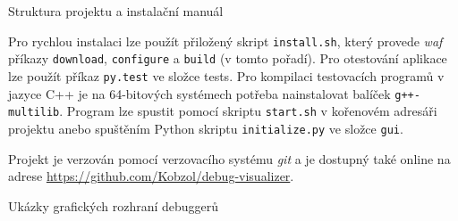 \documentclass[bc,male,python,dept460]{diploma}						%
\newcommand{\parspace}[1][]{
	\ifthenelse{\isempty{#1}}{\vspace{5mm}}{\vspace{#1}}
	\par
}
\begin{document}
\begin{section}{Struktura projektu a instalační manuál}
	\parspace Pro rychlou instalaci lze použít přiložený skript \texttt{install.sh}, který provede \textit{waf} příkazy \texttt{download}, \texttt{configure}
	a \texttt{build} (v tomto pořadí).
	Pro otestování aplikace lze použít příkaz \texttt{py.test} ve složce tests. Pro kompilaci testovacích programů v jazyce C++ je na 64-bitových systémech
	potřeba nainstalovat balíček \texttt{g++-multilib}.
	Program lze spustit pomocí skriptu \texttt{start.sh} v kořenovém adresáři projektu anebo spuštěním Python skriptu \texttt{initialize.py} ve složce \texttt{gui}.
	
	\vspace{5mm}
	
	Projekt je verzován pomocí verzovacího systému \textit{git} a je dostupný také online na adrese \url{https://github.com/Kobzol/debug-visualizer}.
\end{section}

\begin{section}{Ukázky grafických rozhraní debuggerů}
\label{appendix:gui}
\end{section}

\clearpage
\end{document}
